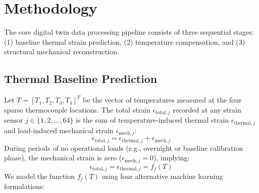\documentclass[11pt,journal,onecolumn]{IEEEtran}
\begin{document}
\section{Methodology}
The core digital twin data processing pipeline consists of three sequential stages: (1) baseline thermal strain prediction, (2) temperature compensation, and (3) structural mechanical reconstruction.

\subsection{Thermal Baseline Prediction}
Let $T = [T_1, T_2, T_3, T_4]^T$ be the vector of temperatures measured at the four sparse thermocouple locations. The total strain $\epsilon_{\text{total}, j}$ recorded at any strain sensor $j \in \{1, 2, \dots, 64\}$ is the sum of temperature-induced thermal strain $\epsilon_{\text{thermal}, j}$ and load-induced mechanical strain $\epsilon_{\text{mech}, j}$:
\begin{equation}
    \epsilon_{\text{total}, j} = \epsilon_{\text{thermal}, j} + \epsilon_{\text{mech}, j}
\end{equation}
During periods of no operational loads (e.g., overnight or baseline calibration phase), the mechanical strain is zero ($\epsilon_{\text{mech}, j} = 0$), implying:
\begin{equation}
    \epsilon_{\text{total}, j} = \epsilon_{\text{thermal}, j} = f_j(T)
\end{equation}
We model the function $f_j(T)$ using four alternative machine learning formulations:
\end{document}
